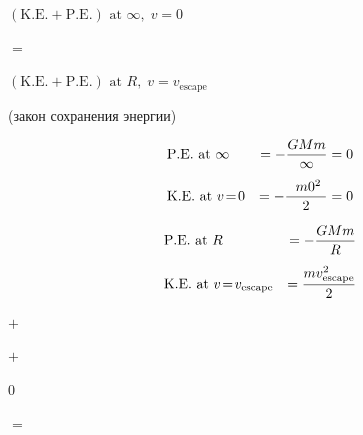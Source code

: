 \documentclass[11pt,oneside]{article}
\begin{document}
\Needspace{0.45\textheight}
\begin{center}
\begin{minipage}[t]{0.307\linewidth}
\((\mathrm{K.E.}+\mathrm{P.E.})\text{ at }\infty,\;v\!=\!0\)
\end{minipage}\hfill
\begin{minipage}[t]{0.307\linewidth}
\(=\)
\end{minipage}\hfill
\begin{minipage}[t]{0.307\linewidth}
\((\mathrm{K.E.}+\mathrm{P.E.})\text{ at }R,\;v\!=\!v_\text{escape}\)
\end{minipage}\hfill
\par\medskip
\begin{minipage}[t]{0.307\linewidth}
(закон сохранения энергии)
\end{minipage}\hfill
\par\medskip
\begin{minipage}[t]{0.307\linewidth}

\begin{equation*}
            \begin{alignedat}{3}
            &\mathrm{P.E.}\text{ at }\infty\hskip1em  &= -\frac{GMm}{\infty} &=0\\[1ex]
            &\mathrm{K.E.}\text{ at }v\!=\!0\hskip1em &=-\frac{~~m0^2~}{2}    &=0
            \end{alignedat}
            \end{equation*}

\end{minipage}\hfill
\begin{minipage}[t]{0.307\linewidth}

\begin{equation*}
            \begin{alignedat}{2}
            &\mathrm{P.E.}\text{ at }R &\hskip1em=-\frac{GMm}{R}\\[1ex]
            &\mathrm{K.E.}\text{ at }v\!=\!v_\text{escape}&\hskip1em=\frac{mv_\text{escape}^2}{2}
            \end{alignedat}
            \end{equation*}

\end{minipage}\hfill
\par\medskip
\begin{minipage}[t]{0.307\linewidth}
\(+\)
\end{minipage}\hfill
\begin{minipage}[t]{0.307\linewidth}
\(+\)
\end{minipage}\hfill
\par\medskip
\begin{minipage}[t]{0.307\linewidth}
\(0\)
\end{minipage}\hfill
\begin{minipage}[t]{0.307\linewidth}
\(=\)
\end{minipage}\hfill
\begin{minipage}[t]{0.307\linewidth}


\end{minipage}
\end{center}
\end{document}
